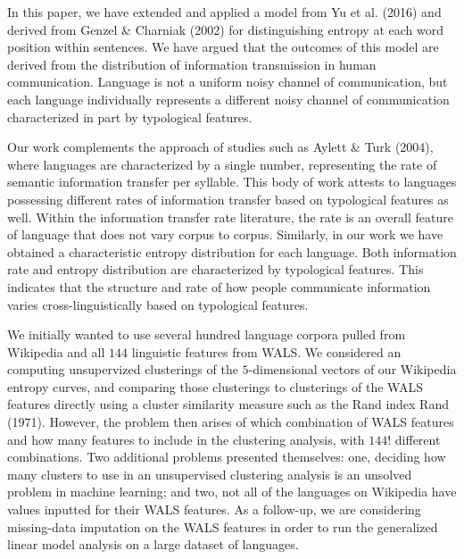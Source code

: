 \documentclass[10pt, letterpaper]{article}
\begin{document}
In this paper, we have extended and applied a model from Yu et al.
(2016) and derived from Genzel \& Charniak (2002) for distinguishing
entropy at each word position within sentences. We have argued that the
outcomes of this model are derived from the distribution of information
transmission in human communication. Language is not a uniform noisy
channel of communication, but each language individually represents a
different noisy channel of communication characterized in part by
typological features.

Our work complements the approach of studies such as Aylett \& Turk
(2004), where languages are characterized by a single number,
representing the rate of semantic information transfer per syllable.
This body of work attests to languages possessing different rates of
information transfer based on typological features as well. Within the
information transfer rate literature, the rate is an overall feature of
language that does not vary corpus to corpus. Similarly, in our work we
have obtained a characteristic entropy distribution for each language.
Both information rate and entropy distribution are characterized by
typological features. This indicates that the structure and rate of how
people communicate information varies cross-linguistically based on
typological features.

We initially wanted to use several hundred language corpora pulled from
Wikipedia and all \(144\) linguistic features from WALS. We considered
an computing unsupervized clusterings of the \(5\)-dimensional vectors
of our Wikipedia entropy curves, and comparing those clusterings to
clusterings of the WALS features directly using a cluster similarity
measure such as the Rand index Rand (1971). However, the problem then
arises of which combination of WALS features and how many features to
include in the clustering analysis, with \(144!\) different
combinations. Two additional problems presented themselves: one,
deciding how many clusters to use in an unsupervised clustering analysis
is an unsolved problem in machine learning; and two, not all of the
languages on Wikipedia have values inputted for their WALS features. As
a follow-up, we are considering missing-data imputation on the WALS
features in order to run the generalized linear model analysis on a
large dataset of languages.
\end{document}

